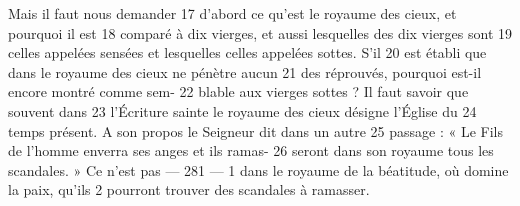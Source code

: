 Mais il faut nous demander	 
17	 	d'abord ce qu'est le royaume des cieux, et pourquoi il est	 
18	 	comparé à dix vierges, et aussi lesquelles des dix vierges sont	 
19	 	celles appelées sensées et lesquelles celles appelées sottes. S'il	 
20	 	est établi que dans le royaume des cieux ne pénètre aucun	 
21	 	des réprouvés, pourquoi est-il encore montré comme sem-	 
22	 	blable aux vierges sottes ? Il faut savoir que souvent dans	 
23	 	l'Écriture sainte le royaume des cieux désigne l'Église du	 
24	 	temps présent. A son propos le Seigneur dit dans un autre	 
25	 	passage : « Le Fils de l'homme enverra ses anges et ils ramas-	 
26	 	seront dans son royaume tous les scandales. » Ce n'est pas	 
 	--- 281 ---	 
1	 	dans le royaume de la béatitude, où domine la paix, qu'ils	 
2	 	pourront trouver des scandales à ramasser.